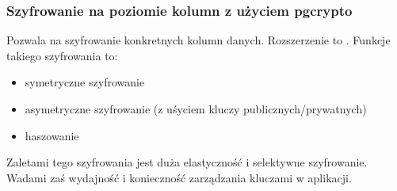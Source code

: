\documentclass[a4paper,11pt,openany,english]{sphinxmanual}
\begin{document}
\subsubsection{Szyfrowanie na poziomie kolumn z użyciem pgcrypto}
\label{\detokenize{rozdzial2/Bezpieczenstwo/index:szyfrowanie-na-poziomie-kolumn-z-uzyciem-pgcrypto}}
\sphinxAtStartPar
Pozwala na szyfrowanie konkretnych kolumn danych. Rozszerzenie to . Funkcje takiego szyfrowania to:
\begin{itemize}
\item {} 
\sphinxAtStartPar
symetryczne szyfrowanie

\end{itemize}

\begin{sphinxVerbatim}[commandchars=\\\{\}]
  
  
\end{sphinxVerbatim}
\begin{itemize}
\item {} 
\sphinxAtStartPar
asymetryczne szyfrowanie (z uśyciem kluczy publicznych/prywatnych)

\item {} 
\sphinxAtStartPar
haszowanie

\end{itemize}

\begin{sphinxVerbatim}[commandchars=\\\{\}]
  
\end{sphinxVerbatim}

\sphinxAtStartPar
Zaletami tego szyfrowania jest duża elastyczność i selektywne szyfrowanie. Wadami zaś wydajność i konieczność zarządzania kluczami w aplikacji.
\end{document}
